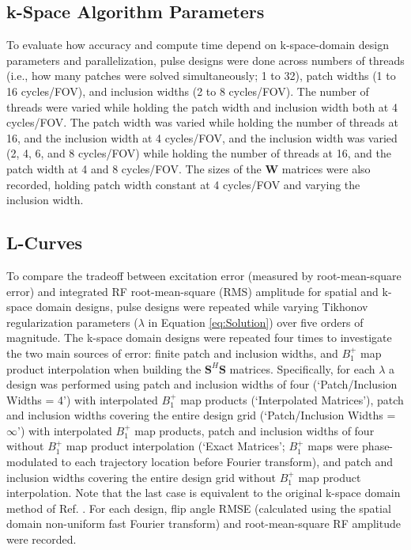 \subsection*{k-Space Algorithm Parameters}
To evaluate how accuracy and compute time depend on k-space-domain design parameters and parallelization,
pulse designs were done across numbers of threads (i.e., how many patches were solved simultaneously; 1 to 32), 
patch widths (1 to 16 cycles/FOV), and inclusion widths (2 to 8 cycles/FOV). 
The number of threads were varied while holding the patch width and inclusion width both at 4 cycles/FOV.
The patch width was varied while holding the number of threads at 16, and the inclusion width at 4 cycles/FOV,
and the inclusion width was varied (2, 4, 6, and 8 cycles/FOV) while holding the number of threads at 16, and the patch width at 4 and 8 cycles/FOV. 
The sizes of the $\bm{W}$ matrices were also recorded, holding patch width constant at 4 cycles/FOV and varying the inclusion width. 

\subsection*{L-Curves}
To compare the tradeoff between excitation error (measured by root-mean-square error)
and integrated RF root-mean-square (RMS) amplitude for spatial and k-space domain designs,
pulse designs were repeated while varying Tikhonov regularization parameters ($\lambda$ in Equation \ref{eq:Solution}) 
over five orders of magnitude. 
The k-space domain designs were repeated four times to investigate the two main sources of error:
finite patch and inclusion widths, 
and $B_1^+$ map product interpolation when building the $\bm{S}^H\bm{S}$ matrices. 
Specifically, for each $\lambda$ a design was performed using patch and inclusion widths of four (`Patch/Inclusion Widths = 4')
with interpolated $B_1^+$ map products (`Interpolated Matrices'),
patch and inclusion widths covering the entire design grid (`Patch/Inclusion Widths = $\infty$') with interpolated $B_1^+$ map products,
patch and inclusion widths of four without $B_1^+$ map product interpolation (`Exact Matrices'; 
$B_1^+$ maps were phase-modulated to each trajectory location before Fourier transform),
and patch and inclusion widths covering the entire design grid without $B_1^+$ map product interpolation. 
Note that the last case is equivalent to the original k-space domain method of Ref. \cite{Katscher:2003:Magn-Reson-Med:12509830}.
For each design, flip angle RMSE (calculated using the spatial domain non-uniform fast Fourier transform) and root-mean-square RF amplitude were
recorded.

